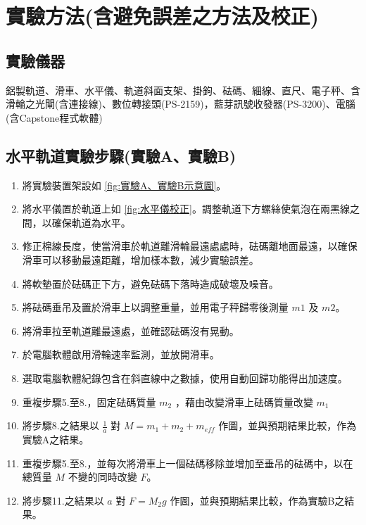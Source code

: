 \documentclass[11pt,a4paper]{article}
\theoremstyle{definition}
\begin{document}
    \section{實驗方法(含避免誤差之方法及校正)}

        \subsection{實驗儀器}

            鋁製軌道、滑車、水平儀、軌道斜面支架、掛鉤、砝碼、細線、直尺、電子秤、含滑輪之光閘(含連接線)、數位轉接頭(PS-2159)，藍芽訊號收發器(PS-3200)、電腦(含Capstone程式軟體)

        \subsection{水平軌道實驗步驟(實驗A、實驗B)}

            \begin{enumerate}

                \item 將實驗裝置架設如 \autoref{fig:實驗A、實驗B示意圖}。
                \item 將水平儀置於軌道上如 \autoref{fig:水平儀校正}。調整軌道下方螺絲使氣泡在兩黑線之間，以確保軌道為水平。
                \item 修正棉線長度，使當滑車於軌道離滑輪最遠處處時，砝碼離地面最遠，以確保滑車可以移動最遠距離，增加樣本數，減少實驗誤差。
                \item 將軟墊置於砝碼正下方，避免砝碼下落時造成破壞及噪音。
                \item 將砝碼垂吊及置於滑車上以調整重量，並用電子秤歸零後測量 $m1$ 及 $m2$。
                \item 將滑車拉至軌道離最遠處，並確認砝碼沒有晃動。
                \item 於電腦軟體啟用滑輪速率監測，並放開滑車。
                \item 選取電腦軟體紀錄包含在斜直線中之數據，使用自動回歸功能得出加速度。
                \item 重複步驟5.至8.，固定砝碼質量 $m_2$ ，藉由改變滑車上砝碼質量改變 $m_1$ 
                \item 將步驟8.之結果以 $\displaystyle\frac{1}{a}$ 對 $M = m_1 + m_2 + m_{eff}$ 作圖，並與預期結果比較，作為實驗A之結果。
                \item 重複步驟5.至8.，並每次將滑車上一個砝碼移除並增加至垂吊的砝碼中，以在總質量 $M$ 不變的同時改變 $F$。
                \item 將步驟11.之結果以 $\displaystyle a$ 對 $F = M_2g$ 作圖，並與預期結果比較，作為實驗B之結果。

            \end{enumerate}
\end{document}
